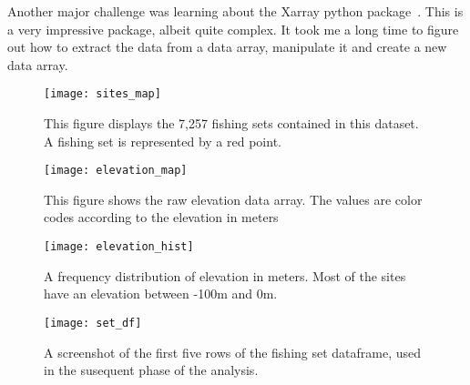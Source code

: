 Another major challenge was learning about the Xarray python package~\cite{xarray}.
This is a very impressive package, albeit quite complex.
It took me a long time to figure out how to extract the data from a data array, manipulate it and create a new data array.


\begin{figure}
    \texttt{[image: sites\_map]}
    \caption{This figure displays the 7,257 fishing sets contained in this dataset. A fishing set is represented by a red point.}
    \label{fig:set_map}
\end{figure}

\begin{figure}
    \texttt{[image: elevation\_map]}
    \caption{This figure shows the raw elevation data array. The values are color codes according to the elevation in meters}
    \label{fig:elevation_map}
\end{figure}

\begin{figure}
    \texttt{[image: elevation\_hist]}
    \caption{A frequency distribution of elevation in meters. Most of the sites have an elevation between -100m and 0m.}
    \label{fig:elevation_hist}
\end{figure}

\begin{figure}
    \texttt{[image: set\_df]}
    \caption{A screenshot of the first five rows of the fishing set dataframe, used in the susequent phase of the analysis.}
    \label{fig:set_df}
\end{figure}